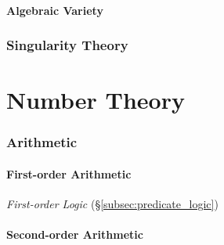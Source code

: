 \documentclass{article}
\begin{document}
\subsection{Algebraic Variety}\label{subsec:algebraic_variety}



\section{Singularity Theory}\label{sec:singularity_theory}



\part{Number Theory}\label{sec:number_theory}



\section{Arithmetic}\label{sec:arithmetic}

\subsection{First-order Arithmetic}\label{subsec:firstorder_arithmetic}

\emph{First-order Logic} (\S\ref{subsec:predicate_logic})

\subsection{Second-order Arithmetic}\label{subsec:second_order_arithmetic}
\end{document}
